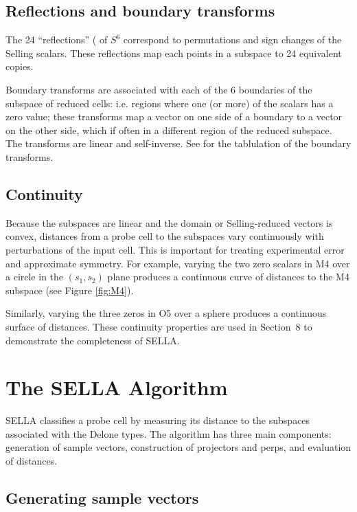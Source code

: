 \documentclass[preprint]{iucr}              %
\begin{document}
	\subsection{Reflections and boundary transforms}
	
	The 24 ``reflections'' ( of $S^6$ correspond to permutations and sign changes of the
	Selling scalars. These reflections map each points in a subspace to 24 equivalent copies.
	
	Boundary transforms are associated with each of the 6 boundaries of the
	subspace of reduced cells: i.e. regions where one (or more) of the 
	scalars has a zero value; these transforms map a
	vector on one side of a boundary to a vector on the other side, which
	if often in a different region of the reduced subspace. The transforms
	are linear and self-inverse. See  for
	the tablulation of the boundary transforms.
	
	\subsection{Continuity}
	
	Because the subspaces are linear and the domain or Selling-reduced vectors is convex, distances from a
	probe cell to the subspaces vary continuously with perturbations of the input cell. This is
	important for treating experimental error and approximate symmetry. For
	example, varying the two zero scalars in M4 over a circle in the $(s_1,s_2)$
	plane produces a continuous curve of distances to the M4 subspace (see Figure \ref{fig:M4}).
	
	Similarly, varying the three zeros in O5 over a sphere produces a continuous
	surface of distances. These continuity properties are used in Section~8 to
	demonstrate the completeness of SELLA.
	
	
	\section{The SELLA Algorithm}
	
	SELLA classifies a probe cell by measuring its distance to the subspaces
	associated with the Delone types. The algorithm has three main components:
	generation of sample vectors, construction of projectors and perps, and
	evaluation of distances.
	
	\subsection{Generating sample vectors}
	
\end{document}
